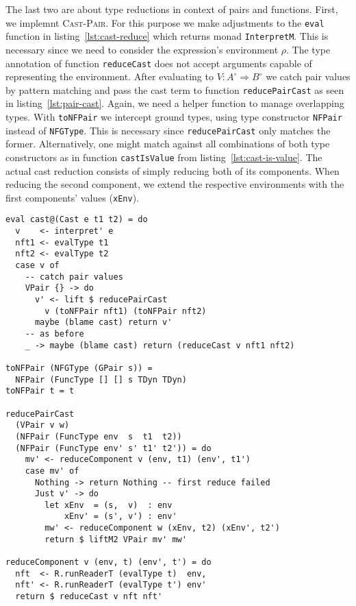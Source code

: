 The last two are about type reductions in context of pairs and functions. First, we implemnt \textsc{Cast-Pair}. For this purpose we make adjustments to the \texttt{eval} function in listing~\ref{lst:cast-reduce} which returns monad \texttt{InterpretM}. This is necessary since we need to consider the expression's environment $\rho$. The type annotation of function \texttt{reduceCast} does not accept arguments capable of representing the environment. After evaluating to $V : A^\circ \Rightarrow B^\circ$ we catch pair values by pattern matching and pass the cast term to function \texttt{reducePairCast} as seen in listing~\ref{lst:pair-cast}. Again, we need a helper function to manage overlapping types. With \texttt{toNFPair} we intercept ground types, using type constructor \texttt{NFPair} instead of \texttt{NFGType}. This is necessary since \texttt{reducePairCast} only matches the former. Alternatively, one might match against all combinations of both type constructors as in function \texttt{castIsValue} from listing~\ref{lst:cast-is-value}. The actual cast reduction consists of simply reducing both of its components. When reducing the second component, we extend the respective environments with the first components' values (\texttt{xEnv}).

\begin{lstlisting}[float,
  caption=Rule \textsc{Cast-Pair} (\texttt{Interpreter.hs}),
  label=lst:pair-cast]
eval cast@(Cast e t1 t2) = do
  v    <- interpret' e
  nft1 <- evalType t1
  nft2 <- evalType t2
  case v of
    -- catch pair values
    VPair {} -> do
      v' <- lift $ reducePairCast
        v (toNFPair nft1) (toNFPair nft2)
      maybe (blame cast) return v'
    -- as before
    _ -> maybe (blame cast) return (reduceCast v nft1 nft2)

toNFPair (NFGType (GPair s)) =
  NFPair (FuncType [] [] s TDyn TDyn)
toNFPair t = t

reducePairCast
  (VPair v w)
  (NFPair (FuncType env  s  t1  t2))
  (NFPair (FuncType env' s' t1' t2')) = do
    mv' <- reduceComponent v (env, t1) (env', t1')
    case mv' of
      Nothing -> return Nothing -- first reduce failed
      Just v' -> do
        let xEnv  = (s,  v)  : env
            xEnv' = (s', v') : env'
        mw' <- reduceComponent w (xEnv, t2) (xEnv', t2')
        return $ liftM2 VPair mv' mw'

reduceComponent v (env, t) (env', t') = do
  nft  <- R.runReaderT (evalType t)  env,
  nft' <- R.runReaderT (evalType t') env'
  return $ reduceCast v nft nft'
\end{lstlisting}

